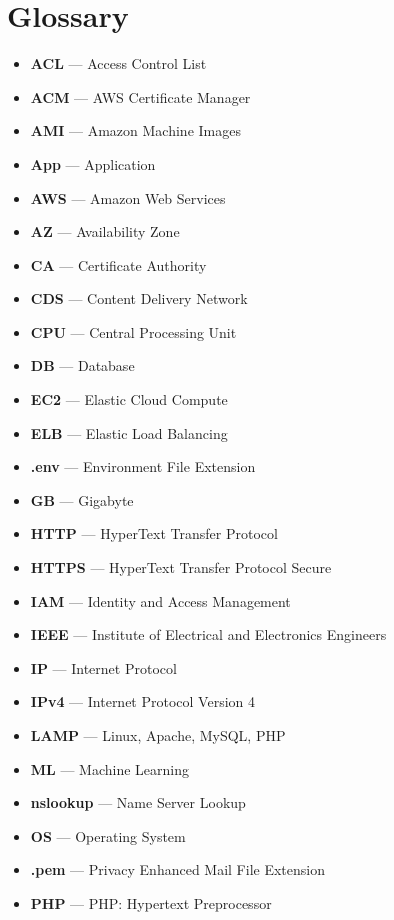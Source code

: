 \chapter{Glossary}\label{ch:glossary}

\begin{itemize}
    \item  \textbf{ACL} — Access Control List
    \item  \textbf{ACM} — AWS Certificate Manager
    \item  \textbf{AMI} — Amazon Machine Images
    \item  \textbf{App} — Application
    \item  \textbf{AWS} — Amazon Web Services
    \item  \textbf{AZ} — Availability Zone
    \item  \textbf{CA} — Certificate Authority
    \item  \textbf{CDS} — Content Delivery Network
    \item  \textbf{CPU} — Central Processing Unit
    \item  \textbf{DB} — Database
    \item  \textbf{EC2} — Elastic Cloud Compute
    \item  \textbf{ELB} — Elastic Load Balancing
    \item  \textbf{.env} — Environment File Extension
    \item  \textbf{GB} — Gigabyte
    \item  \textbf{HTTP} — HyperText Transfer Protocol
    \item  \textbf{HTTPS} — HyperText Transfer Protocol Secure
    \item  \textbf{IAM} — Identity and Access Management
    \item  \textbf{IEEE} — Institute of Electrical and Electronics Engineers
    \item  \textbf{IP} — Internet Protocol
    \item  \textbf{IPv4} — Internet Protocol Version 4
    \item  \textbf{LAMP} — Linux, Apache, MySQL, PHP
    \item  \textbf{ML} — Machine Learning
    \item  \textbf{nslookup} — Name Server Lookup
    \item  \textbf{OS} — Operating System
    \item  \textbf{.pem} — Privacy Enhanced Mail File Extension
    \item  \textbf{PHP} — PHP: Hypertext Preprocessor

\end{itemize}
